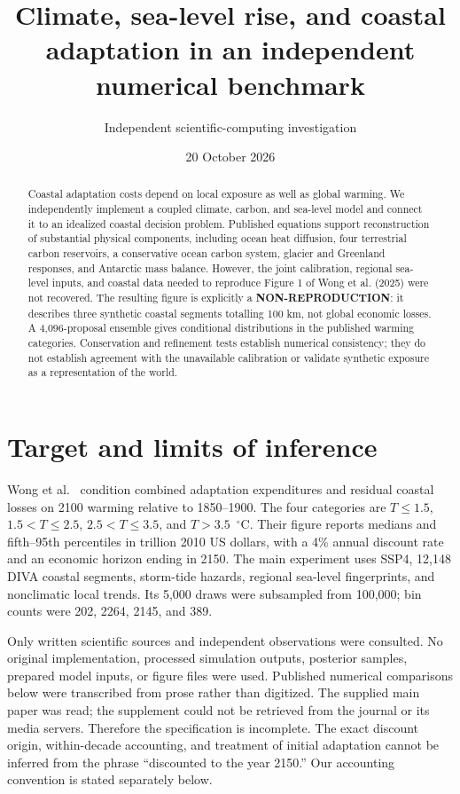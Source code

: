 \documentclass[11pt]{article}
\title{Climate, sea-level rise, and coastal adaptation in an independent numerical benchmark}
\author{Independent scientific-computing investigation}
\date{20 October 2026}
\begin{document}
\maketitle
\begin{abstract}
Coastal adaptation costs depend on local exposure as well as global warming.
We independently implement a coupled climate, carbon, and sea-level model and
connect it to an idealized coastal decision problem. Published equations
support reconstruction of substantial physical components, including ocean
heat diffusion, four terrestrial carbon reservoirs, a conservative ocean
carbon system, glacier and Greenland responses, and Antarctic mass balance.
However, the joint calibration, regional sea-level inputs, and coastal data
needed to reproduce Figure 1 of Wong et al. (2025) were not recovered.
The resulting figure is explicitly a \textbf{NON-REPRODUCTION}: it describes
three synthetic coastal segments totalling 100 km, not global economic losses.
A 4,096-proposal ensemble gives conditional distributions in the published
warming categories. Conservation and refinement tests establish numerical
consistency; they do not establish agreement with the unavailable calibration
or validate synthetic exposure as a representation of the world.
\end{abstract}

\section{Target and limits of inference}
Wong et al.\ \cite{wong2025} condition combined adaptation expenditures and
residual coastal losses on 2100 warming relative to 1850--1900. The four
categories are $T\leq1.5$, $1.5<T\leq2.5$, $2.5<T\leq3.5$, and $T>3.5$~$^\circ$C.
Their figure reports medians and fifth--95th percentiles in trillion 2010 US
dollars, with a 4\% annual discount rate and an economic horizon ending in 2150.
The main experiment uses SSP4, 12,148 DIVA coastal segments, storm-tide hazards,
regional sea-level fingerprints, and nonclimatic local trends. Its 5,000 draws
were subsampled from 100,000; bin counts were 202, 2264, 2145, and 389.

Only written scientific sources and independent observations were consulted.
No original implementation, processed simulation outputs, posterior samples,
prepared model inputs, or figure files were used. Published numerical
comparisons below were transcribed from prose rather than digitized.
The supplied main paper was read; the supplement could not be retrieved from
the journal or its media servers. Therefore the specification is incomplete.
The exact discount origin, within-decade accounting, and treatment of initial
adaptation cannot be inferred from the phrase ``discounted to the year 2150.''
Our accounting convention is stated separately below.
\end{document}
